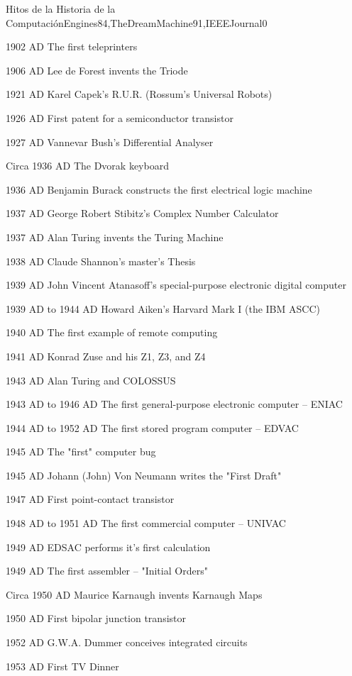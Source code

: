 \begin{syllabus}
\begin{unit}{Hitos de la Historia de la Computación}{Engines84,TheDreamMachine91,IEEEJournal}{0}
\begin{topics}
	\item 1902 AD The first teleprinters
	\item 1906 AD Lee de Forest invents the Triode
	\item 1921 AD Karel Capek's R.U.R. (Rossum's Universal Robots)
	\item 1926 AD First patent for a semiconductor transistor
	\item 1927 AD Vannevar Bush's Differential Analyser
	\item Circa 1936 AD The Dvorak keyboard
	\item 1936 AD Benjamin Burack constructs the first electrical logic machine
	\item 1937 AD George Robert Stibitz's Complex Number Calculator
	\item 1937 AD Alan Turing invents the Turing Machine
	\item 1938 AD Claude Shannon's master's Thesis
	\item 1939 AD John Vincent Atanasoff's special-purpose electronic digital computer
	\item 1939 AD to 1944 AD Howard Aiken's Harvard Mark I (the IBM ASCC)
	\item 1940 AD The first example of remote computing
	\item 1941 AD Konrad Zuse and his Z1, Z3, and Z4
	\item 1943 AD Alan Turing and COLOSSUS
	\item 1943 AD to 1946 AD The first general-purpose electronic computer -- ENIAC
	\item 1944 AD to 1952 AD The first stored program computer -- EDVAC
	\item 1945 AD The "first" computer bug
	\item 1945 AD Johann (John) Von Neumann writes the "First Draft"
	\item 1947 AD First point-contact transistor
	\item 1948 AD to 1951 AD The first commercial computer -- UNIVAC
	\item 1949 AD EDSAC performs it's first calculation
	\item 1949 AD The first assembler -- "Initial Orders"
	\item Circa 1950 AD Maurice Karnaugh invents Karnaugh Maps
	\item 1950 AD First bipolar junction transistor
	\item 1952 AD G.W.A. Dummer conceives integrated circuits
	\item 1953 AD First TV Dinner

\end{topics}
\end{unit}
\end{syllabus}
